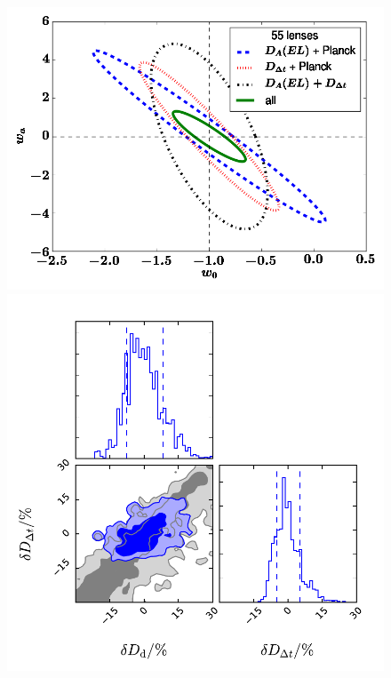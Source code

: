 \begin{figure}[!t]
\begin{minipage}{0.48\linewidth}
    \centering\includegraphics[width=\linewidth]{figures/w_wa_marg_PL_LSST.png}
\end{minipage}\hfill
\begin{minipage}{0.48\linewidth}
    \centering\includegraphics[width=\linewidth]{figures/B1608_DdtDa.pdf}

\end{minipage}
\end{figure}

